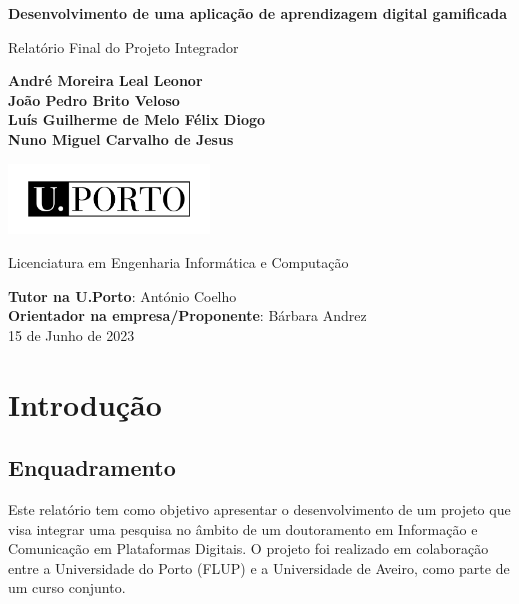 \documentclass[10pt]{article}
\begin{document}
\begin{titlepage}
	\begin{center}
		\vspace*{1cm}
		
    {\fontsize{17}{16}\selectfont \textbf{Desenvolvimento de uma aplicação de aprendizagem digital gamificada}}
     
		
		\vspace{0.5cm}
		Relatório Final do Projeto Integrador
		
		\vspace{1.5cm}
		
		\textbf{André Moreira Leal Leonor}\\
		\textbf{João Pedro Brito Veloso}\\
		\textbf{Luís Guilherme de Melo Félix Diogo}\\
		\textbf{Nuno Miguel Carvalho de Jesus}
		
				\vfill
		
		\includegraphics[width=0.4\textwidth]{UPORTO_fundotransparente}
		
		\vfill
		
	
		
		Licenciatura em Engenharia Informática e Computação
		
		\vspace{0.8cm}
		
		
		\textbf{Tutor na U.Porto}: António Coelho\\
		\textbf{Orientador na empresa/Proponente}: Bárbara Andrez \\ %

\vspace{0.4cm}
		15 de Junho de 2023
		
	\end{center}
\end{titlepage}


\thispagestyle{empty} 
\clearpage

\thispagestyle{empty}
\tableofcontents

 \clearpage
 
\section{Introdução}
\subsection{Enquadramento}
Este relatório tem como objetivo apresentar o desenvolvimento de um projeto que visa integrar uma pesquisa no âmbito de um doutoramento em Informação e Comunicação em Plataformas Digitais. O projeto foi realizado em colaboração entre a Universidade do Porto (FLUP) e a Universidade de Aveiro, como parte de um curso conjunto. 
\end{document}
